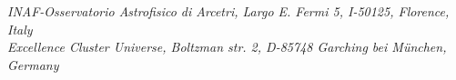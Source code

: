 {    {\arcetri}{\it{INAF-Osservatorio Astrofisico di Arcetri, Largo E. Fermi 5, I-50125, Florence, Italy } } \\ 
    {\exclus}{\it{Excellence Cluster Universe, Boltzman str. 2, D-85748 Garching bei M\"unchen, Germany } } \\
    {}\\
    }

